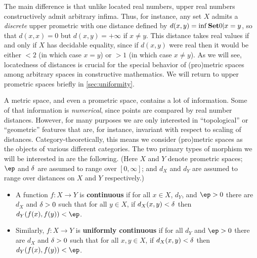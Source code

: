 \documentclass{article}
\def\Rp{[0,\infty]}
\begin{document}
The main difference is that unlike located real numbers, upper real numbers constructively admit arbitrary infima.
Thus, for instance, any set $X$ admits a \emph{discrete} upper prometric with one distance defined by $d(x,y) = \inf \setof{ 0 | x=y }$, so that $d(x,x)=0$ but $d(x,y)=+\infty$ if $x\neq y$.
This distance takes real values if and only if $X$ has decidable equality, since if $d(x,y)$ were real then it would be either $<2$ (in which case $x=y$) or $>1$ (in which case $x\neq y$).
As we will see, locatedness of distances is crucial for the special behavior of (pro)metric spaces among arbitrary spaces in constructive mathematics.
We will return to upper prometric spaces briefly in \cref{sec:uniformity}.

A metric space, and even a prometric space, contains a lot of information.
Some of that information is \emph{numerical}, since points are compared by real number distances.
However, for many purposes we are only interested in ``topological'' or ``geometric'' features that are, for instance, invariant with respect to scaling of distances.
Category-theoretically, this means we consider (pro)metric spaces as the objects of various different categories.
The two primary types of morphism we will be interested in are the following.
(Here $X$ and $Y$ denote prometric spaces; $\ep$ and $\delta$ are assumed to range over $\Rp$; and $d_X$ and $d_Y$ are assumed to range over distances on $X$ and $Y$ respectively.)

\begin{itemize}
\item A function $f:X\to Y$ is \textbf{continuous} if for all $x\in X$, $d_Y$, and $\ep>0$ there are $d_X$ and $\delta>0$ such that for all $y\in X$, if $d_X(x,y)<\delta$ then $d_Y(f(x),f(y))<\ep$.
\item Similarly, $f:X\to Y$ is \textbf{uniformly continuous} if for all $d_Y$ and $\ep>0$ there are $d_X$ and $\delta>0$ such that for all $x,y\in X$, if $d_X(x,y)<\delta$ then $d_Y(f(x),f(y))<\ep$.
\end{itemize}
\end{document}
